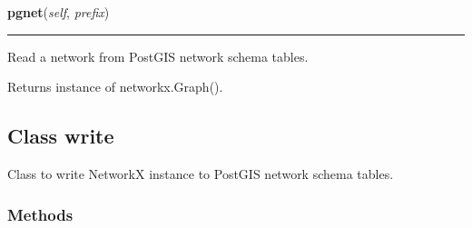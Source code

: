     \label{nx_pgnet:read:pgnet}

    \vspace{0.5ex}

\hspace{.8\funcindent}\begin{boxedminipage}{\funcwidth}

    \raggedright \textbf{pgnet}(\textit{self}, \textit{prefix})

    \vspace{-1.5ex}

    \rule{\textwidth}{0.5\fboxrule}
\setlength{\parskip}{2ex}
    Read a network from PostGIS network schema tables.

    Returns instance of networkx.Graph().

\setlength{\parskip}{1ex}
    \end{boxedminipage}



\subsection{Class write}

    \label{nx_pgnet:write}
Class to write NetworkX instance to PostGIS network schema tables.



  \subsubsection{Methods}

    \label{nx_pgnet:write:__init__}

    \vspace{0.5ex}

